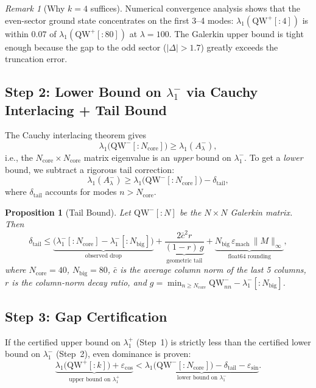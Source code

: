 \documentclass[12pt,a4paper]{article}
\newtheorem{proposition}[theorem]{Proposition}
\theoremstyle{definition}
\theoremstyle{remark}
\newtheorem{remark}[theorem]{Remark}
\begin{document}
\begin{remark}[Why $k=4$ suffices]
Numerical convergence analysis shows that the even-sector ground state concentrates on the first 3--4 modes: $\lambda_1(\mathrm{QW}^+[{:}4])$ is within $0.07$ of $\lambda_1(\mathrm{QW}^+[{:}80])$ at $\lambda = 100$. The Galerkin upper bound is tight enough because the gap to the odd sector ($|\Delta| > 1.7$) greatly exceeds the truncation error.
\end{remark}

\subsection{Step 2: Lower Bound on $\lambda_1^-$ via Cauchy Interlacing + Tail Bound}

The Cauchy interlacing theorem gives
\[
\lambda_1\bigl(\mathrm{QW}^-[{:}N_{\mathrm{core}}]\bigr) \geq \lambda_1(A_\lambda^-),
\]
i.e., the $N_{\mathrm{core}} \times N_{\mathrm{core}}$ matrix eigenvalue is an \emph{upper} bound on $\lambda_1^-$. To get a \emph{lower} bound, we subtract a rigorous tail correction:
\begin{equation}
\label{eq:tail-bound}
\lambda_1(A_\lambda^-) \geq \lambda_1\bigl(\mathrm{QW}^-[{:}N_{\mathrm{core}}]\bigr) - \delta_{\mathrm{tail}},
\end{equation}
where $\delta_{\mathrm{tail}}$ accounts for modes $n > N_{\mathrm{core}}$.

\begin{proposition}[Tail Bound]
\label{prop:tail}
Let $\mathrm{QW}^-[{:}N]$ be the $N \times N$ Galerkin matrix. Then
\[
\delta_{\mathrm{tail}} \leq \underbrace{\bigl(\lambda_1^-[{:}N_{\mathrm{core}}] - \lambda_1^-[{:}N_{\mathrm{big}}]\bigr)}_{\text{observed drop}} + \underbrace{\frac{2\bar{c}^2 r}{(1-r)\,g}}_{\text{geometric tail}} + \underbrace{N_{\mathrm{big}}\,\varepsilon_{\mathrm{mach}}\,\|M\|_\infty}_{\text{float64 rounding}},
\]
where $N_{\mathrm{core}} = 40$, $N_{\mathrm{big}} = 80$, $\bar{c}$ is the average column norm of the last 5 columns, $r$ is the column-norm decay ratio, and $g = \min_{n \geq N_{\mathrm{core}}} \mathrm{QW}^-_{nn} - \lambda_1^-[{:}N_{\mathrm{big}}]$.
\end{proposition}

\subsection{Step 3: Gap Certification}

If the certified upper bound on $\lambda_1^+$ (Step~1) is strictly less than the certified lower bound on $\lambda_1^-$ (Step~2), even dominance is proven:
\begin{equation}
\label{eq:gap-cert}
\underbrace{\lambda_1\bigl(\mathrm{QW}^+[{:}k]\bigr) + \varepsilon_{\mathrm{cos}}}_{\text{upper bound on } \lambda_1^+} < \underbrace{\lambda_1\bigl(\mathrm{QW}^-[{:}N_{\mathrm{core}}]\bigr) - \delta_{\mathrm{tail}} - \varepsilon_{\mathrm{sin}}}_{\text{lower bound on } \lambda_1^-}.
\end{equation}
\end{document}
